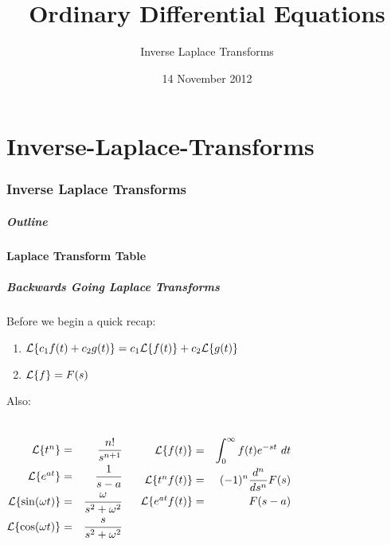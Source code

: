 \part{Inverse-Laplace-Transforms}
\section{Inverse Laplace Transforms}


\title{Ordinary Differential Equations}
\subtitle{Inverse Laplace Transforms}
\date{14 November 2012}

\begin{frame}
  \titlepage
\end{frame}

\begin{frame}
  \frametitle{Outline}
\end{frame}


\subsection{Laplace Transform Table}

\begin{frame}
  \frametitle{Backwards Going Laplace Transforms }

  Before we begin a quick recap:
  \begin{enumerate}
  \item $\laplace{c_1 f(t) + c_2 g(t)}=c_1 \laplace{f(t)} + c_2 \laplace{g(t)}$
  \item $\laplace{f}=F(s)$
  \end{enumerate}

  Also:
  \begin{columns}
    \begin{eqnarray*}
      \laplace{t^n}    & = & \frac{n!}{s^{n+1}} \\ 
      \laplace{e^{at}} & = & \frac{1}{s-a} \\ 
      \laplace{\sin(\omega t)} & = & \frac{\omega}{s^2+\omega^2} \\
      \laplace{\cos(\omega t)} & = & \frac{s}{s^2+\omega^2} \\ 
    \end{eqnarray*}

    \begin{eqnarray*}
      \laplace{f(t)}  & = & \int^\infty_0 f(t) e^{-st} ~ dt \\ 
      \laplace{t^nf(t)} & = & (-1)^n\frac{d^n}{ds^n}F(s) \\
      \laplace{e^{at}f(t)} & = & F(s-a) 
    \end{eqnarray*}

  \end{columns}


\end{frame}

